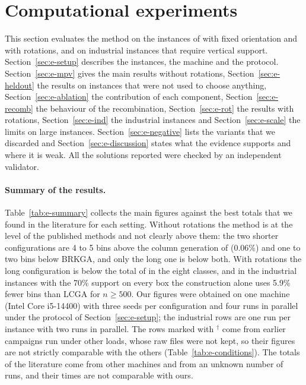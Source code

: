 \providecommand{\todo}[1]{\textcolor{red}{[TODO: #1]}}

\section{Computational experiments}
\label{sec:experiments-bpp}

This section evaluates the method on the instances of \citet{Martello2000} with fixed
orientation and with rotations, and on industrial instances that require vertical support.
Section~\ref{sec:e-setup} describes the instances, the machine and the protocol.
Section~\ref{sec:e-mpv} gives the main results without rotations,
Section~\ref{sec:e-heldout} the results on instances that were not used to choose anything,
Section~\ref{sec:e-ablation} the contribution of each component,
Section~\ref{sec:e-recomb} the behaviour of the recombination,
Section~\ref{sec:e-rot} the results with rotations,
Section~\ref{sec:e-ind} the industrial instances and Section~\ref{sec:e-scale} the limits on
large instances. Section~\ref{sec:e-negative} lists the variants that we discarded and
Section~\ref{sec:e-discussion} states what the evidence supports and where it is weak. All the solutions reported were checked by an independent validator.

\paragraph{Summary of the results.}
Table~\ref{tab:e-summary} collects the main figures against the best totals that we found in the literature for each setting. Without rotations the method is at the level of the
published methods and not clearly above them: the two shorter configurations are 4 to 5 bins above the column generation of \citet{Mahvash2018} (0.06\%) and one to two bins below BRKGA, and only the long one is below both. With rotations
the long configuration is below the total of \citet{Mahvash2018} in the eight classes, and in the industrial instances with the 70\% support on every box the construction alone uses 5.9\% fewer bins than LCGA for $n\ge 500$.
Our figures were obtained on one machine (Intel Core i5-14400) with three seeds per configuration and four runs in parallel under the protocol of Section~\ref{sec:e-setup}; the industrial rows are one run per
instance with two runs in parallel. The rows marked with $^\dagger$ come from earlier campaigns run under other loads, whose raw files were not kept, so their figures are not strictly comparable with the others
(Table~\ref{tab:e-conditions}). The totals of the literature come from other machines and from an unknown number of runs, and their times are not comparable with ours.

